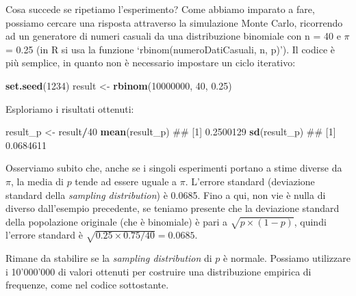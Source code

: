 \documentclass[a4paper,12pt,oneside]{book}
\newenvironment{Shaded}{\begin{snugshade}}{\end{snugshade}}
\newcommand{\KeywordTok}[1]{\textcolor[rgb]{0.13,0.29,0.53}{\textbf{#1}}}
\newcommand{\DecValTok}[1]{\textcolor[rgb]{0.00,0.00,0.81}{#1}}
\newcommand{\FloatTok}[1]{\textcolor[rgb]{0.00,0.00,0.81}{#1}}
\newcommand{\StringTok}[1]{\textcolor[rgb]{0.31,0.60,0.02}{#1}}
\newcommand{\OperatorTok}[1]{\textcolor[rgb]{0.81,0.36,0.00}{\textbf{#1}}}
\newcommand{\NormalTok}[1]{#1}
\theoremstyle{definition}
\theoremstyle{definition}
\theoremstyle{definition}
\theoremstyle{remark}
\begin{document}
Cosa succede se ripetiamo l'esperimento? Come abbiamo imparato a fare,
possiamo cercare una risposta attraverso la simulazione Monte Carlo,
ricorrendo ad un generatore di numeri casuali da una distribuzione
binomiale con n = 40 e \(\pi\) = 0.25 (in R si usa la funzione
`rbinom(numeroDatiCasuali, n, p)'). Il codice è più semplice, in quanto
non è necessario impostare un ciclo iterativo:

\begin{Shaded}
\begin{Highlighting}[]
\KeywordTok{set.seed}\NormalTok{(}\DecValTok{1234}\NormalTok{)}
\NormalTok{result <-}\StringTok{ }\KeywordTok{rbinom}\NormalTok{(}\DecValTok{10000000}\NormalTok{, }\DecValTok{40}\NormalTok{, }\FloatTok{0.25}\NormalTok{)}
\end{Highlighting}
\end{Shaded}

Esploriamo i risultati ottenuti:

\begin{Shaded}
\begin{Highlighting}[]
\NormalTok{result_p <-}\StringTok{ }\NormalTok{result}\OperatorTok{/}\DecValTok{40}
\KeywordTok{mean}\NormalTok{(result_p)}
\NormalTok{## [1] 0.2500129}
\KeywordTok{sd}\NormalTok{(result_p)}
\NormalTok{## [1] 0.0684611}
\end{Highlighting}
\end{Shaded}

Osserviamo subito che, anche se i singoli esperimenti portano a stime
diverse da \(\pi\), la media di \(p\) tende ad essere uguale a \(\pi\).
L'errore standard (deviazione standard della \emph{sampling
distribution}) è 0.0685. Fino a qui, non vie è nulla di diverso
dall'esempio precedente, se teniamo presente che la deviazione standard
della popolazione originale (che è binomiale) è pari a
\(\sqrt{p \times (1 - p)}\), quindi l'errore standard è
\(\sqrt{0.25 \times 0.75 / 40} = 0.0685\).

Rimane da stabilire se la \emph{sampling distribution} di \(p\) è
normale. Possiamo utilizzare i 10'000'000 di valori ottenuti per
costruire una distribuzione empirica di frequenze, come nel codice
sottostante.
\end{document}
